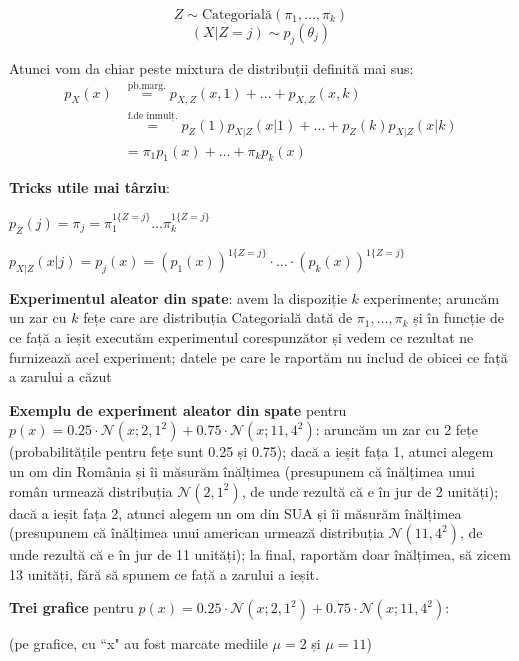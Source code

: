 \documentclass[12pt]{article}
\begin{document}
	$$Z \sim \text{Categorială}(\pi_1,\dots,\pi_k)$$
	$$(X|Z=j) \sim p_j(\theta_j)$$
	
	Atunci vom da chiar peste mixtura de distribuții definită mai sus: 
	\begin{align*}
	p_X(x) &\stackrel{\text{pb.marg.}}{=} p_{X,Z}(x,1)+\dots+p_{X,Z}(x,k) \\ 
	&\stackrel{\text{f.de înmulț.}}{=} p_Z(1) p_{X|Z}(x|1)+\dots+p_Z(k)p_{X|Z}(x|k) \\
	&= \pi_1 p_1(x) + \dots + \pi_k p_k(x)
	\end{align*}
	
	\textbf{Tricks utile mai târziu}: 
	
	$p_Z(j) = \pi_j = \pi_1^{1\{Z=j\}} \dots \pi_k^{1\{Z=j\}}$
	
	$p_{X|Z}(x|j) = p_j(x) = (p_1(x))^{1\{Z=j\}} \cdot \dots \cdot (p_k(x))^{1\{Z=j\}}$
	
	\textbf{Experimentul aleator din spate}: avem la dispoziție $k$ experimente; aruncăm un zar cu $k$ fețe care are distribuția Categorială dată de $\pi_1,\dots,\pi_k$ și în funcție de ce față a ieșit executăm experimentul corespunzător și vedem ce rezultat ne furnizează acel experiment; datele pe care le raportăm nu includ de obicei ce față a zarului a căzut
	
	\textbf{Exemplu de experiment aleator din spate} pentru $p(x) =0.25\cdot \mathcal{N}(x;2,1^2) + 0.75\cdot\mathcal{N}(x;11,4^2)$: aruncăm un zar cu 2 fețe (probabilitățile pentru fețe sunt 0.25 și 0.75); dacă a ieșit fața 1, atunci alegem un om din România și îi măsurăm înălțimea (presupunem că înălțimea unui român urmează distribuția $\mathcal{N}(2,1^2)$, de unde rezultă că e în jur de 2 unități); dacă a ieșit fața 2, atunci alegem un om din SUA și îi măsurăm înălțimea (presupunem că înălțimea unui american urmează distribuția $\mathcal{N}(11,4^2)$, de unde rezultă că e în jur de 11 unități); la final, raportăm doar înălțimea, să zicem 13 unități, fără să spunem ce față a zarului a ieșit.
	
	\textbf{Trei grafice} pentru $p(x) =0.25\cdot \mathcal{N}(x;2,1^2) + 0.75\cdot\mathcal{N}(x;11,4^2)$:
	
	(pe grafice, cu ``x" au fost marcate mediile $\mu = 2$ și $\mu = 11$)
	
\end{document}
